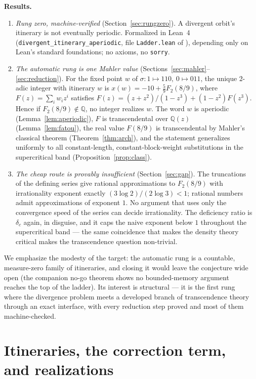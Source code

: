 \documentclass[11pt]{article}
\theoremstyle{definition}
\newcommand{\Q}{\mathbb{Q}}
\newcommand{\code}[1]{\texttt{#1}}
\begin{document}
\textbf{Results.}
\begin{enumerate}
\item \emph{Rung zero, machine-verified}
(Section~\ref{sec:rungzero}). A divergent orbit's itinerary is not
eventually periodic. Formalized in Lean~4
(\code{divergent\_itinerary\_aperiodic}, file \code{Ladder.lean}
of \cite{companion}), depending only on Lean's standard foundations;
no axioms, no \code{sorry}.
\item \emph{The automatic rung is one Mahler value}
(Sections~\ref{sec:mahler}--\ref{sec:reduction}). For the fixed point
$w$ of $\sigma: 1 \mapsto 110,\ 0 \mapsto 011$, the unique $2$-adic
integer with itinerary $w$ is $x(w) = -10 + \tfrac59 F_2(8/9)$, where
$F(z) = \sum_i w_i z^i$ satisfies
$F(z) = (z+z^2)/(1-z^3) + (1-z^2)F(z^3)$. Hence if $F_2(8/9) \notin
\Q$, no integer realizes $w$. The word $w$ is aperiodic
(Lemma~\ref{lem:aperiodic}), $F$ is transcendental over $\Q(z)$
(Lemma~\ref{lem:fatou}), the real value $F(8/9)$ is transcendental by
Mahler's classical theorem (Theorem~\ref{thm:arch}), and the statement
generalizes uniformly to all constant-length, constant-block-weight
substitutions in the supercritical band
(Proposition~\ref{prop:class}).
\item \emph{The cheap route is provably insufficient}
(Section~\ref{sec:gap}). The truncations of the defining series give
rational approximations to $F_2(8/9)$ with irrationality exponent
exactly $(3\log 2)/(2\log 3) < 1$; rational numbers admit
approximations of exponent $1$. No argument that uses only the
convergence speed of the series can decide irrationality. The
deficiency ratio is $\delta_c$ again, in disguise, and it caps the
naive exponent below $1$ throughout the supercritical band ---
the same coincidence that makes the density theory critical makes the
transcendence question non-trivial.
\end{enumerate}

We emphasize the modesty of the target: the automatic rung is a
countable, measure-zero family of itineraries, and closing it would
leave the conjecture wide open (the companion no-go theorem
\cite{companion} shows no bounded-memory argument reaches the top of
the ladder). Its interest is structural --- it is the first rung where
the divergence problem meets a developed branch of transcendence
theory through an exact interface, with every reduction step proved
and most of them machine-checked.

\section{Itineraries, the correction term, and realizations}
\label{sec:realization}
\end{document}
